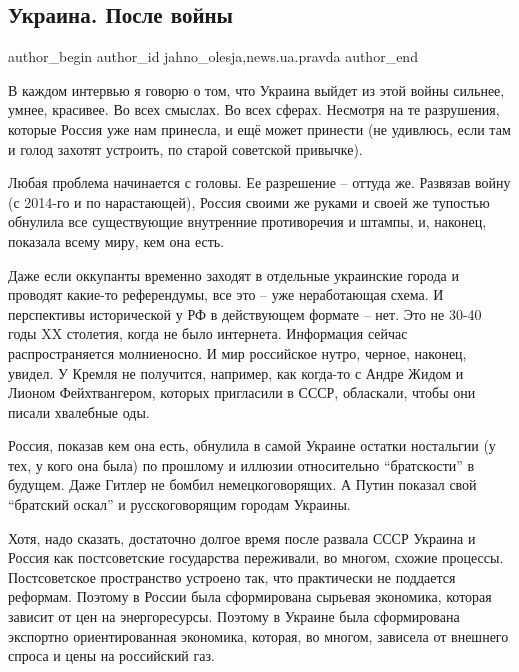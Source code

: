  
 
 
 
 
 
\subsection{Украина. После войны}
\label{sec:30_03_2022.stz.news.ua.pravda.1.ukraina_posle_vojny}
 
\ifcmt
 author_begin
   author_id jahno_olesja,news.ua.pravda
 author_end
\fi

В каждом интервью я говорю о том, что Украина выйдет из этой войны сильнее,
умнее, красивее. Во всех смыслах. Во всех сферах. Несмотря на те разрушения,
которые Россия уже нам принесла, и ещё может принести (не удивлюсь, если там и
голод захотят устроить, по старой советской привычке).

Любая проблема начинается с головы. Ее разрешение – оттуда же. Развязав войну
(с 2014-го и по нарастающей), Россия своими же руками и своей же тупостью
обнулила все существующие внутренние противоречия и штампы, и, наконец,
показала всему миру, кем она есть.

Даже если оккупанты временно заходят в отдельные украинские города и проводят
какие-то референдумы, все это – уже неработающая схема. И перспективы
исторической у РФ в действующем формате – нет. Это не 30-40 годы XX столетия,
когда не было интернета. Информация сейчас распространяется молниеносно. И мир
российское нутро, черное, наконец, увидел. У Кремля не получится, например, как
когда-то с Андре Жидом и Лионом Фейхтвангером, которых пригласили в СССР,
обласкали, чтобы они писали хвалебные оды.

Россия, показав кем она есть, обнулила в самой Украине остатки ностальгии (у
тех, у кого она была) по прошлому и иллюзии относительно \enquote{братскости} в
будущем. Даже Гитлер не бомбил немецкоговорящих. А Путин показал свой \enquote{братский
оскал} и русскоговорящим городам Украины.

Хотя, надо сказать, достаточно долгое время после развала СССР Украина и Россия
как постсоветские государства переживали, во многом, схожие процессы.
Постсоветское пространство устроено так, что практически не поддается реформам.
Поэтому в России была сформирована сырьевая экономика, которая зависит от цен
на энергоресурсы. Поэтому в Украине была сформирована экспортно ориентированная
экономика, которая, во многом, зависела от внешнего спроса и цены на российский
газ.

